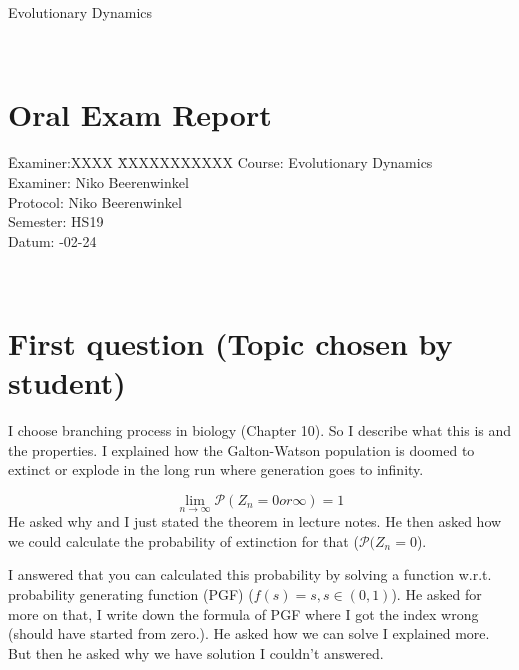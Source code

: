 \documentclass[a4paper,12pt]{article}
\title{\headtitle}
\author{VIS}
\def\headtitle{Evolutionary Dynamics} %
\begin{document}
\pagestyle{empty}
\parindent 0pt	%
\flushleft %
%
%
\color[rgb]{0,0,.5}
{\LARGE \headtitle\par}
\hrulefill\\
%
\section*{Oral Exam Report}
\vspace{.5cm}
  \begin{tabbing}
    \quad \= Examiner:XXXX \= XXXXXXXXXXX \kill %
    \>Course:		\>	\headtitle\\[1ex]
    \>Examiner: 	\>	Niko Beerenwinkel \\[1ex]	%
    \>Protocol: 	\>	Niko Beerenwinkel \\[1ex]	%
    \>Semester:	\>	HS19\\[1ex]	%
    \>Datum: 		-02-24%
  \end{tabbing}
%
\hrulefill\\
\color{black}
\vspace{.7cm}

\section{First question (Topic chosen by student)}
I choose branching process in biology (Chapter 10). So I describe what this is and the properties. I explained how the Galton-Watson population is doomed to extinct or explode in the long run where generation goes to infinity.

$$
\lim_{n \to \infty} \mathcal{P}(Z_n = 0 or \infty) = 1
$$
He asked why and I just stated the theorem in lecture notes. He then asked how we could calculate the probability of extinction for that ($\mathcal{P}(Z_n = 0$). 

I answered that you can calculated this probability by solving a function w.r.t. probability generating function (PGF) ($f(s) = s, s \in (0,1)$). He asked for more on that, I write down the formula of PGF where I got the index wrong (should have started from zero.). He asked how we can solve I explained more. But then he asked why we have solution I couldn't answered. 
\end{document}
